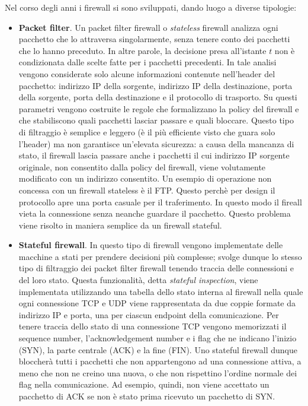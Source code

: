 Nel corso degli anni i firewall si sono sviluppati, dando luogo a diverse tipologie:
\begin{itemize}
	\item \textbf{Packet filter}. Un packet filter firewall o \textit{stateless} firewall analizza ogni pacchetto che lo attraversa singolarmente, senza tenere conto dei pacchetti che lo hanno preceduto. In altre parole, la decisione presa all'istante $t$ non è condizionata dalle scelte fatte per i pacchetti precedenti. In tale analisi vengono considerate solo alcune informazioni contenute nell'header del pacchetto: indirizzo IP della sorgente, indirizzo IP della destinazione, porta della sorgente, porta della destinazione e il protocollo di trasporto. Su questi parametri vengono costruite le regole che formalizzano la policy del firewall e che stabiliscono quali pacchetti lasciar passare e quali bloccare. Questo tipo di filtraggio è semplice e leggero (è il più efficiente visto che guara solo l'header) ma non garantisce un'elevata sicurezza: a causa della mancanza di stato, il firewall lascia passare anche i pacchetti il cui indirizzo IP sorgente originale, non consentito dalla policy del firewall, viene volutamente modificato con un indirizzo consentito. Un esempio di operazione non concessa con un firewall stateless è il FTP. Questo perchè per design il protocollo apre una porta casuale per il traferimento. In questo modo il fireall vieta la connessione senza neanche guardare il pacchetto. Questo problema viene risolto in maniera semplice da un firewall stateful.
	\item \textbf{Stateful firewall}. In questo tipo di firewall vengono implementate delle macchine a stati per prendere decisioni più complesse; svolge dunque lo stesso tipo di filtraggio dei packet filter firewall tenendo traccia delle connessioni e del loro stato. Questa funzionalità, detta \textit{stateful inspection}, viene implementata utilizzando una tabella dello stato interna al firewall nella quale ogni connessione TCP e UDP viene rappresentata da due coppie formate da indirizzo IP e porta, una per ciascun endpoint della comunicazione. Per tenere traccia dello stato di una connessione TCP vengono memorizzati il sequence number, l'acknowledgement number e i flag che ne indicano l'inizio (SYN), la parte centrale (ACK) e la fine (FIN).  Uno stateful firewall dunque bloccherà tutti i pacchetti che non appartengono ad una connessione attiva, a meno che non ne creino una nuova, o che non rispettino l'ordine normale dei flag nella comunicazione. Ad esempio, quindi, non viene accettato un pacchetto di ACK se non è stato prima ricevuto un pacchetto di SYN.\\

\end{itemize}
